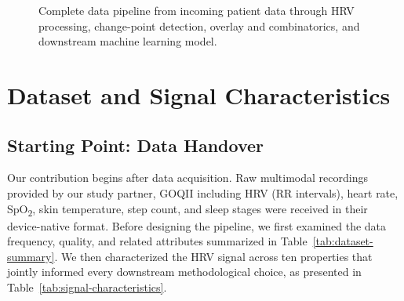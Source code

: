 \documentclass[11pt, a4paper]{article}
\theoremstyle{plain}
\theoremstyle{definition}
\begin{document}
\begin{figure}[H]
{%
}
\caption{Complete data pipeline from incoming patient data through HRV
processing, change-point detection, overlay and combinatorics, and
downstream machine learning model.}
\label{fig:pipeline-overview}
\end{figure}

\section{Dataset and Signal Characteristics}

\subsection{Starting Point: Data Handover}

Our contribution begins after data acquisition. Raw multimodal recordings
provided by our study partner, GOQII including HRV (RR intervals), heart
rate, SpO\textsubscript{2}, skin temperature, step count, and sleep stages
were received in their device-native format. Before designing the pipeline,
we first examined the data frequency, quality, and related attributes
summarized in Table~\ref{tab:dataset-summary}. We then characterized the HRV
signal across ten properties that jointly informed every downstream
methodological choice, as presented in Table~\ref{tab:signal-characteristics}.
\end{document}
